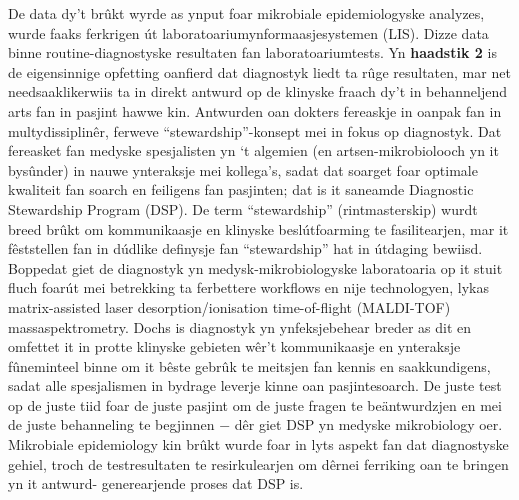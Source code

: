 \documentclass[
]{book}
\begin{document}
De data dy't brûkt wyrde as ynput foar mikrobiale epidemiologyske analyzes, wurde faaks ferkrigen út laboratoariumynformaasjesystemen (LIS). Dizze data binne routine-diagnostyske resultaten fan laboratoariumtests. Yn \textbf{haadstik 2} is de eigensinnige opfetting oanfierd dat diagnostyk liedt ta rûge resultaten, mar net needsaaklikerwiis ta in direkt antwurd op de klinyske fraach dy't in behanneljend arts fan in pasjint hawwe kin. Antwurden oan dokters fereaskje in oanpak fan in multydissiplinêr, ferweve ``stewardship''-konsept mei in fokus op diagnostyk. Dat fereasket fan medyske spesjalisten yn `t algemien (en artsen-mikrobiolooch yn it bysûnder) in nauwe ynteraksje mei kollega's, sadat dat soarget foar optimale kwaliteit fan soarch en feiligens fan pasjinten; dat is it saneamde Diagnostic Stewardship Program (DSP). De term ``stewardship'' (rintmasterskip) wurdt breed brûkt om kommunikaasje en klinyske beslútfoarming te fasilitearjen, mar it fêststellen fan in dúdlike definysje fan ``stewardship'' hat in útdaging bewiisd. Boppedat giet de diagnostyk yn medysk-mikrobiologyske laboratoaria op it stuit fluch foarút mei betrekking ta ferbettere workflows en nije technologyen, lykas matrix-assisted laser desorption/ionisation time-of-flight (MALDI-TOF) massaspektrometry. Dochs is diagnostyk yn ynfeksjebehear breder as dit en omfettet it in protte klinyske gebieten wêr't kommunikaasje en ynteraksje fûneminteel binne om it bêste gebrûk te meitsjen fan kennis en saakkundigens, sadat alle spesjalismen in bydrage leverje kinne oan pasjintesoarch. De juste test op de juste tiid foar de juste pasjint om de juste fragen te beäntwurdzjen en mei de juste behanneling te begjinnen − dêr giet DSP yn medyske mikrobiology oer. Mikrobiale epidemiology kin brûkt wurde foar in lyts aspekt fan dat diagnostyske gehiel, troch de testresultaten te resirkulearjen om dêrnei ferriking oan te bringen yn it antwurd- generearjende proses dat DSP is.
\end{document}
